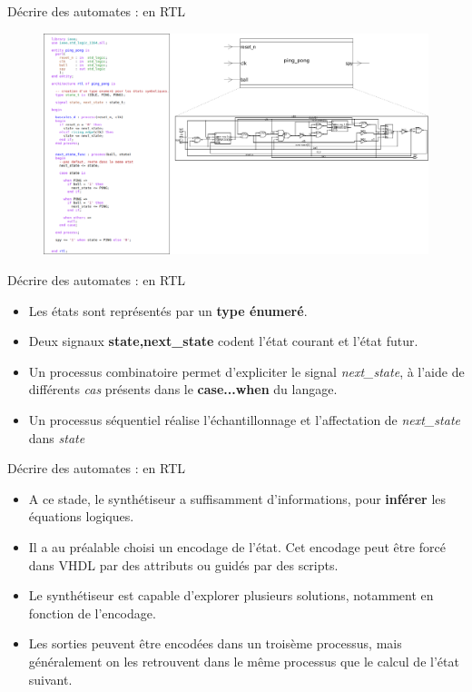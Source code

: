 \documentclass[xcolor=table]{beamer} %
\begin{document}
\begin{frame}{Décrire des automates : en RTL}
  \begin{figure}[h]
    \centering
    \includegraphics[scale=0.21]{./figures/ping_pong_rtl.png}
  \end{figure}
\end{frame}

\begin{frame}{Décrire des automates : en RTL}
  \begin{itemize}
    \item Les états sont représentés par un \textbf{type énumeré}.
    \item Deux signaux \textbf{state,next\_state} codent l'état courant et l'état futur.
    \item Un processus combinatoire permet d'expliciter le signal {\it next\_state}, à l'aide
    de différents {\it cas} présents dans le \textbf{case...when} du langage.
    \item Un processus séquentiel réalise l'échantillonnage et l'affectation de {\it next\_state} dans {\it state}
  \end{itemize}
\end{frame}

\begin{frame}{Décrire des automates : en RTL}
  \begin{itemize}
    \item A ce stade, le synthétiseur a suffisamment d'informations, pour \textbf{inférer} les équations logiques.
    \item Il a au préalable choisi un encodage de l'état. Cet encodage peut être forcé dans VHDL par des attributs ou guidés par des scripts.
    \item Le synthétiseur est capable d'explorer plusieurs solutions, notamment en fonction de l'encodage.
    \item Les sorties peuvent être encodées dans un troisème processus, mais généralement on les retrouvent dans le même processus que le calcul
    de l'état suivant.
  \end{itemize}
\end{frame}
\end{document}
